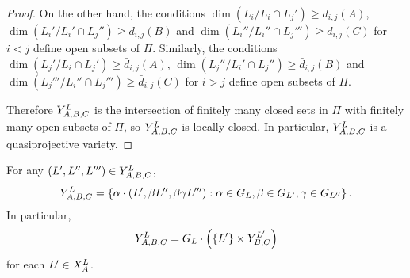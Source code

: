 \documentclass[a4paper, 11pt]{report}
\begin{document}
\begin{proof}
On the other hand, the conditions $\dim\left(L_i/{L_i\cap L_j'}\right)\geq d_{i,j}{(A)}$, $\dim\left(L_i'/{L_i'\cap L_j''}\right)\geq d_{i,j}{(B)}$ and $\dim\left(L_i''/{L_i''\cap L_j'''}\right)\geq d_{i,j}{(C)}$ for $i<j$ define open subsets of $\Pi$. Similarly, the conditions $\dim\left(L_j'/{L_i\cap L_j'}\right)\geq \bar{d}_{i,j}{(A)}$, $\dim\left(L_j''/{L_i'\cap L_j''}\right)\geq \bar{d}_{i,j}{(B)}$ and $\dim\left(L_j'''/{L_i''\cap L_j'''}\right)\geq \bar{d}_{i,j}{(C)}$ for $i>j$ define open subsets of $\Pi$.

Therefore $\yprod[L]{A,B,C}$ is the intersection of finitely many closed sets in $\Pi$ with finitely many open subsets of $\Pi$, so $\yprod[L]{A,B,C}$ is locally closed. In particular, $\yprod[L]{A,B,C}$ is a quasiprojective variety.
\end{proof}

\begin{lemma}\label{lemma:y-triple-stabilisers}
For any $(L',L'',L''')\in\yprod[L]{A,B,C}$,
\begin{equation*}
\yprod[L]{A,B,C} = \left\{ \alpha\cdot (L',\beta L'',\beta\gamma L'''): \alpha\in G_L, \beta\in G_{L'}, \gamma\in G_{L''}\right\}.
\end{equation*}
In particular,
\begin{equation*}
\yprod[L]{A,B,C} = G_L\cdot\left(\{L'\}\times\yprod[L']{B,C}\right)
\end{equation*}
for each $L'\in\xprod[L]{A}$.
\end{lemma}
\end{document}
